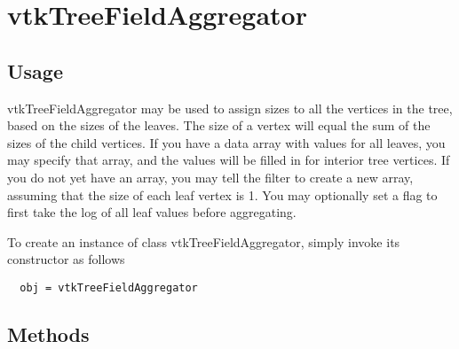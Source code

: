 \section{vtkTreeFieldAggregator}

\subsection{Usage}

 vtkTreeFieldAggregator may be used to assign sizes to all the vertices in the
 tree, based on the sizes of the leaves.  The size of a vertex will equal
 the sum of the sizes of the child vertices.  If you have a data array with
 values for all leaves, you may specify that array, and the values will
 be filled in for interior tree vertices.  If you do not yet have an array,
 you may tell the filter to create a new array, assuming that the size
 of each leaf vertex is 1.  You may optionally set a flag to first take the
 log of all leaf values before aggregating.

To create an instance of class vtkTreeFieldAggregator, simply
invoke its constructor as follows
\begin{verbatim}
  obj = vtkTreeFieldAggregator
\end{verbatim}
\subsection{Methods}

